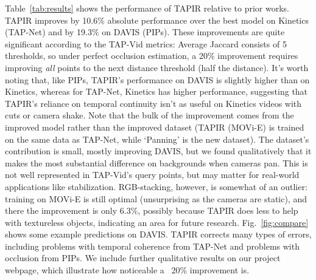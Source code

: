 \documentclass[10pt,twocolumn,letterpaper]{article}
\begin{document}
Table~\ref{tab:results} shows the performance of TAPIR relative to prior works.  TAPIR improves by 10.6\% absolute performance over the best model on Kinetics (TAP-Net) and by 19.3\% on DAVIS (PIPs).  These improvements are quite significant according to the TAP-Vid metrics: Average Jaccard consists of 5 thresholds, so under perfect occlusion estimation, a 20\% improvement requires improving \textit{all} points to the next distance threshold (half the distance). It's worth noting that, like PIPs, TAPIR's performance on DAVIS is slightly higher than on Kinetics, whereas for TAP-Net, Kinetics has higher performance, suggesting that TAPIR's reliance on temporal continuity isn't as useful on Kinetics videos with cuts or camera shake.  Note that the bulk of the improvement comes from the improved model rather than the improved dataset (TAPIR (MOVi-E) is trained on the same data as TAP-Net, while `Panning' is the new dataset).  The dataset's contribution is small, mostly improving DAVIS, but we found qualitatively that it makes the most substantial difference on backgrounds when cameras pan.  This is not well represented in TAP-Vid's query points, but may matter for real-world applications like stabilization.  RGB-stacking, however, is somewhat of an outlier: training on MOVi-E is still optimal (unsurprising as the cameras are static), and there the improvement is only $6.3\%$, possibly because TAPIR does less to help with textureless objects, indicating an area for future research. Fig.~\ref{fig:compare} shows some example predictions on DAVIS.  TAPIR corrects many types of errors, including problems with temporal coherence from TAP-Net and problems with occlusion from PIPs. We include further qualitative results on our project webpage, which illustrate how noticeable a ~20\% improvement is. 

\begin{table}[t]
\caption{\textbf{Comparison under query first metrics.}  We see largely the same relative performance trend whether the model is queried in a `strided' fashion or whether the model is queried with the first frame where the point appeared, although performance is overall lower than the `strided' evaluation. }
\label{tab:query_first_compare}
\end{table}
\end{document}
